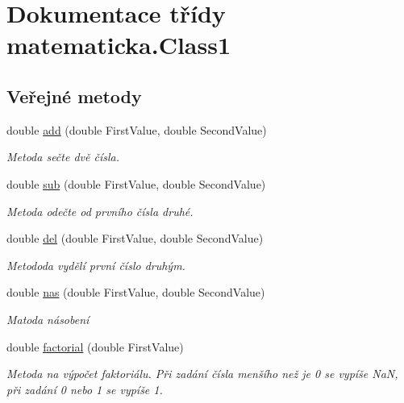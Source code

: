 \hypertarget{classmatematicka_1_1_class1}{}\section{Dokumentace třídy matematicka.\+Class1}
\label{classmatematicka_1_1_class1}
\subsection*{Veřejné metody}
\begin{DoxyCompactItemize}
\item 
double \hyperlink{classmatematicka_1_1_class1_a5c948c8022d77c04dfcbd3cd32de8f37}{add} (double First\+Value, double Second\+Value)
\begin{DoxyCompactList}\small\item\em Metoda sečte dvě čísla. \end{DoxyCompactList}\item 
double \hyperlink{classmatematicka_1_1_class1_a2bcdf689a4aa779ba951f10d366d4b26}{sub} (double First\+Value, double Second\+Value)
\begin{DoxyCompactList}\small\item\em Metoda odečte od prvního čísla druhé. \end{DoxyCompactList}\item 
double \hyperlink{classmatematicka_1_1_class1_a12216aaf60170805a254d2a3fc0724e3}{del} (double First\+Value, double Second\+Value)
\begin{DoxyCompactList}\small\item\em Metododa vydělí první číslo druhým. \end{DoxyCompactList}\item 
double \hyperlink{classmatematicka_1_1_class1_a26b448a82946c7e597b13fb405637860}{nas} (double First\+Value, double Second\+Value)
\begin{DoxyCompactList}\small\item\em Matoda násobení \end{DoxyCompactList}\item 
double \hyperlink{classmatematicka_1_1_class1_a607a4b87c6cad4a61ce52541389d567d}{factorial} (double First\+Value)
\begin{DoxyCompactList}\small\item\em Metoda na výpočet faktoriálu. Při zadání čísla menšího než je 0 se vypíše NaN, při zadání 0 nebo 1 se vypíše 1. \end{DoxyCompactList}\item 

\end{DoxyCompactItemize}
